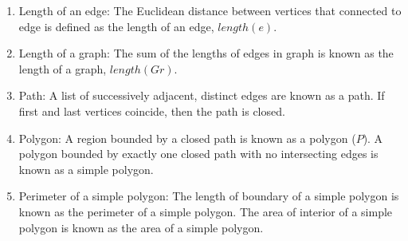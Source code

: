 \documentclass{article}
\begin{document}
\begin{enumerate}
\def\labelenumi{\roman{enumi})}
\setcounter{enumi}{2}
\item
  Length of an edge: The Euclidean distance between vertices that
  connected to edge is defined as the length of an edge, \(length(e)\).
\item
  Length of a graph: The sum of the lengths of edges in graph is known
  as the length of a graph, \(length(Gr)\).
\item
  Path: A list of successively adjacent, distinct edges are known as a
  path. If first and last vertices coincide, then the path is closed.
\item
  Polygon: A region bounded by a closed path is known as a polygon
  (\(P\)). A polygon bounded by exactly one closed path with no
  intersecting edges is known as a simple polygon.
\item
  Perimeter of a simple polygon: The length of boundary of a simple
  polygon is known as the perimeter of a simple polygon. The area of
  interior of a simple polygon is known as the area of a simple polygon.
\end{enumerate}
\end{document}
